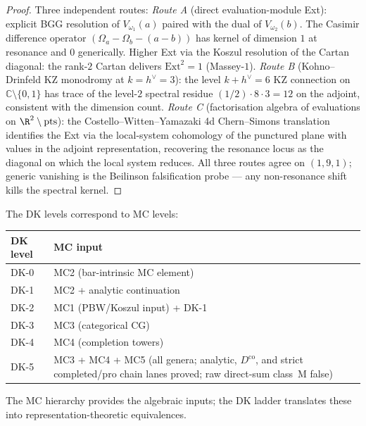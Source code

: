 \begin{proof}
Three independent routes:
\emph{Route A} (direct evaluation-module Ext): explicit BGG resolution
of $V_{\omega_1}(a)$ paired with the dual of $V_{\omega_2}(b)$. The
Casimir difference operator
$(\Omega_a - \Omega_b - (a - b))$ has kernel of dimension $1$ at
resonance and $0$ generically. Higher Ext via the Koszul resolution
of the Cartan diagonal: the rank-$2$ Cartan delivers
$\mathrm{Ext}^2 = 1$ (Massey-$1$).
\emph{Route B} (Kohno--Drinfeld KZ monodromy at $k = h^\vee = 3$):
the level $k + h^\vee = 6$ KZ connection on
$\mathbb{C} \setminus \{0, 1\}$ has trace of the level-$2$ spectral
residue $(1/2) \cdot 8 \cdot 3 = 12$ on the adjoint, consistent with
the dimension count.
\emph{Route C} (factorisation algebra of evaluations on
$\R^2 \setminus \mathrm{pts}$): the Costello--Witten--Yamazaki 4d
Chern--Simons translation identifies the Ext via the local-system
cohomology of the punctured plane with values in the adjoint
representation, recovering the resonance locus as the diagonal
on which the local system reduces.
All three routes agree on $(1, 9, 1)$; generic vanishing is the
Beilinson falsification probe — any non-resonance shift kills the
spectral kernel.
\end{proof}

\begin{remark}
The DK levels correspond to MC levels:
\begin{center}
\renewcommand{\arraystretch}{1.2}
\begin{tabular}{ll}
\textbf{DK level} & \textbf{MC input} \\
\hline
DK-0 & MC2 (bar-intrinsic MC element) \\
DK-1 & MC2 + analytic continuation \\
DK-2 & MC1 (PBW/Koszul input) + DK-1 \\
DK-3 & MC3 (categorical CG) \\
DK-4 & MC4 (completion towers) \\
DK-5 & MC3 + MC4 + MC5 (all genera; analytic, $D^{\mathrm{co}}$, and strict completed/pro chain lanes proved; raw direct-sum class~M false)
\end{tabular}
\end{center}
The MC hierarchy provides the algebraic inputs; the DK
ladder translates these into representation-theoretic
equivalences.
\end{remark}


